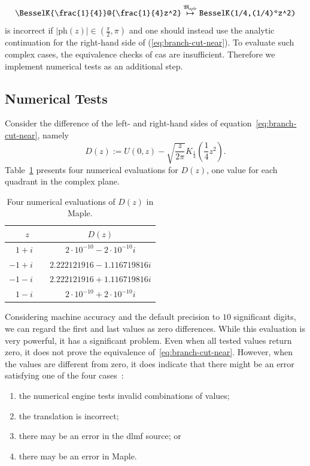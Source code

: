 \documentclass[a4paper,11pt]{article}
\newcommand{\Maple}{Maple}
\newcommand{\langMaple}{\mathfrak{M}_{aple}}
\newcommand{\tableRowSpace}{\rule{0pt}{0.9\normalbaselineskip}}
\theoremstyle{defTheoStyle}
\theoremstyle{defExampStyle}
\DeclareRobustCommand{\cpi}{{\pi}}
\DeclareRobustCommand{\iunit}{{i}}
\newcommand{\ph}[1]{\mathrm{ph}\!\left(#1\right)}
\begin{document}
\begin{equation}
\verb|\BesselK{\frac{1}{4}}@{\frac{1}{4}z^2}| \overset{\langMaple}{\mapsto} \verb|BesselK(1/4,(1/4)*z^2)|
\end{equation}
is incorrect if $|\ph{z}| \in \left(\frac{\cpi}{2}, \cpi\right)$ and one should instead use the analytic continuation for the right-hand side of (\ref{eq:branch-cut-near}). 
To evaluate such complex cases, the equivalence checks of \gls*{cas} are insufficient. Therefore we implement numerical tests as an additional step.

\subsection{Numerical Tests}\label{sec:numerical-tests}
Consider the difference of the left- and right-hand sides of equation~\eqref{eq:branch-cut-near}, namely
\begin{equation}\label{eq:difference}
D(z) := U(0,z) - \sqrt{\frac{z}{2\cpi}} K_{\frac{1}{4}}\left(\frac{1}{4}z^2\right).
\end{equation}
Table~\ref{tab:computations-for-difference} presents four numerical evaluations for $D(z)$, one value for each quadrant in the complex plane.
\begin{table}[ht]
\centering
\begin{tabular}{rcc}
	\hline
	$z\ \ $ & & $D(z)$\\
	\hline
	\tableRowSpace{} $1+\iunit$ & & $2 \cdot 10^{-10} - 2 \cdot 10^{-10} \iunit$\\
	$-1+\iunit$& & $2.222121916 - 1.116719816 \iunit$\\
	$-1-\iunit$& & $2.222121916 + 1.116719816 \iunit$\\
	$1-\iunit$ & & $2 \cdot 10^{-10} + 2 \cdot 10^{-10} \iunit$\\
	\hline
\end{tabular}
\caption{Four numerical evaluations of $D(z)$ in \Maple.}
\label{tab:computations-for-difference}
\end{table}

Considering machine accuracy and the default precision to $10$ significant digits, we can regard the first and last values as zero differences. While this evaluation is very powerful, it has a significant problem. Even when all tested values return zero, it does not prove the equivalence of~\eqref{eq:branch-cut-near}. However, when the values are different from zero, it does indicate that there might be an error satisfying one of the four cases~\parencite{NumericalTests:Paper}:
\begin{enumerate}
\item the numerical engine tests invalid combinations of values;
\item the translation is incorrect;
\item there may be an error in the \gls*{dlmf} source; or
\item there may be an error in \Maple.
\end{enumerate}
\end{document}

